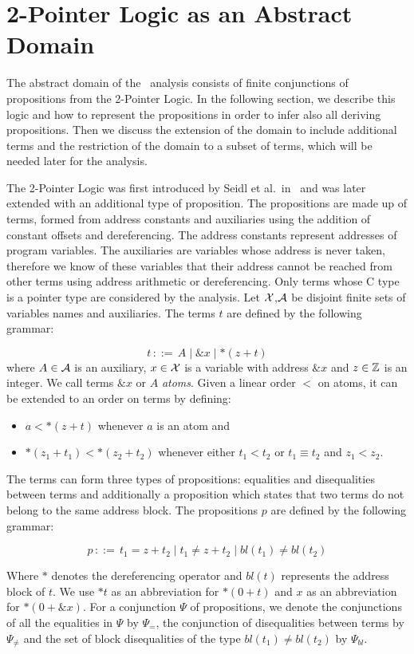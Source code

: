 \chapter{2-Pointer Logic as an Abstract Domain}\label{chapter:2pointer}

The abstract domain of the \cpo\ analysis consists of finite conjunctions of propositions from the 2-Pointer Logic.
In the following section, we describe this logic and how to represent the propositions in order to
infer also all deriving propositions.
Then we discuss the extension of the domain to include additional terms and the restriction of the domain to a subset of terms,
which will be needed later for the analysis.

The 2-Pointer Logic was first introduced by Seidl et al.\ in~\cite{2pointer} and was later extended with an additional type of proposition.
The propositions are made up of terms, formed from address constants and auxiliaries using the addition of constant offsets and dereferencing.
The address constants represent addresses of program variables.
The auxiliaries are variables whose address is never taken, therefore
we know of these variables that their address cannot be reached from other terms using address arithmetic or dereferencing.
Only terms whose C type is a pointer type are considered by the analysis.
Let $\mathcal{X}$,$\mathcal{A}$ be disjoint finite sets of variables names and auxiliaries.
The terms $t$ are defined by the following grammar:

\[
    t\,{::=}\,A \mid \&x \mid *(z+t)
\]
where $A\in \mathcal{A}$ is an auxiliary, $x \in \mathcal{X}$ is a variable with address $\&x$ and $z \in \mathbb{Z}$ is an integer.
We call terms $\&x$ or $A$ \emph{atoms}.
Given a linear order $<$ on atoms, it can be extended to an order on terms by defining:
\begin{itemize}
    \item $a < *(z+t)$ whenever $a$ is an atom and
    \item $*(z_1 + t_1) < *(z_2 + t_2)$ whenever either $t_1 < t_2$ or $t_1 \equiv t_2$ and $z_1 < z_2$.
\end{itemize}

The terms can form three types of propositions: equalities and disequalities between terms and additionally a proposition which states that two terms do not belong to the same address block.
The propositions $p$ are defined by the following grammar:

\[
    p\,{::=}\,t_1=z+t_2 \mid t_1\neq z+t_2\mid bl(t_1) \neq bl(t_2)
\]

Where $*$ denotes the dereferencing operator and $bl(t)$ represents the address block of $t$.
We use $*t$ as an abbreviation for $*(0+t)$ and $x$ as an abbreviation for $*(0+\&x)$.
For a conjunction $\Psi$ of propositions, we denote the conjunctions of all the equalities in $\Psi$ by $\Psi_{=}$, the conjunction of disequalities between terms by $\Psi_{\neq}$ and the set of block disequalities of the type $bl(t_1) \neq bl(t_2)$ by $\Psi_{bl}$.


